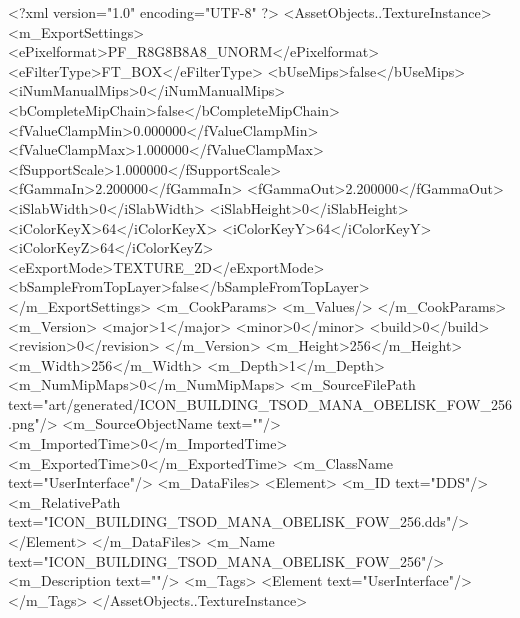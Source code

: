 <?xml version="1.0" encoding="UTF-8" ?>
<AssetObjects..TextureInstance>
	<m_ExportSettings>
		<ePixelformat>PF_R8G8B8A8_UNORM</ePixelformat>
		<eFilterType>FT_BOX</eFilterType>
		<bUseMips>false</bUseMips>
		<iNumManualMips>0</iNumManualMips>
		<bCompleteMipChain>false</bCompleteMipChain>
		<fValueClampMin>0.000000</fValueClampMin>
		<fValueClampMax>1.000000</fValueClampMax>
		<fSupportScale>1.000000</fSupportScale>
		<fGammaIn>2.200000</fGammaIn>
		<fGammaOut>2.200000</fGammaOut>
		<iSlabWidth>0</iSlabWidth>
		<iSlabHeight>0</iSlabHeight>
		<iColorKeyX>64</iColorKeyX>
		<iColorKeyY>64</iColorKeyY>
		<iColorKeyZ>64</iColorKeyZ>
		<eExportMode>TEXTURE_2D</eExportMode>
		<bSampleFromTopLayer>false</bSampleFromTopLayer>
	</m_ExportSettings>
	<m_CookParams>
		<m_Values/>
	</m_CookParams>
	<m_Version>
		<major>1</major>
		<minor>0</minor>
		<build>0</build>
		<revision>0</revision>
	</m_Version>
	<m_Height>256</m_Height>
	<m_Width>256</m_Width>
	<m_Depth>1</m_Depth>
	<m_NumMipMaps>0</m_NumMipMaps>
	<m_SourceFilePath text="art/generated/ICON_BUILDING_TSOD_MANA_OBELISK_FOW_256.png"/>
	<m_SourceObjectName text=""/>
	<m_ImportedTime>0</m_ImportedTime>
	<m_ExportedTime>0</m_ExportedTime>
	<m_ClassName text="UserInterface"/>
	<m_DataFiles>
		<Element>
			<m_ID text="DDS"/>
			<m_RelativePath text="ICON_BUILDING_TSOD_MANA_OBELISK_FOW_256.dds"/>
		</Element>
	</m_DataFiles>
	<m_Name text="ICON_BUILDING_TSOD_MANA_OBELISK_FOW_256"/>
	<m_Description text=""/>
	<m_Tags>
		<Element text="UserInterface"/>
	</m_Tags>
</AssetObjects..TextureInstance>
